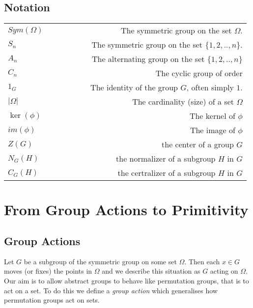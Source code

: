 \documentclass[]{article}
\theoremstyle{definition}
\begin{document}
\subsection{Notation}
\vspace{0.4cm}

\begin{tabular}{lcr}
$Sym(\Omega)$ &  $\qquad \qquad $	&  The symmetric group on the set $\Omega$.\\ 
$S_n$ & & The symmetric group on the set $\{1,2,..,n\}$. \\
$A_n$ & & The alternating group on the set $\{1,2,..,n\}$ \\
$C_n$ & & The cyclic group of order \\
$1_G$ & & The identity of the group $G$, often simply $1$.\\
$|\Omega|$ & & The cardinality (size) of a set $\Omega$\\
$\ker(\phi)$ & & The kernel of $\phi$ \\
$im(\phi)$ & & The image of $\phi$ \\
$Z(G)$ & & the center of a group $G$ \\
$N_G(H)$ & & the normalizer of a subgroup $H$ in $G$ \\
$C_G(H)$ & & the certralizer of a subgroup $H$ in $G$ \\ 
\end{tabular} 
\clearpage
\section{From Group Actions to Primitivity}
\subsection{Group Actions}

Let $G$ be a subgroup of the symmetric group on some set $\Omega$. Then each $x \in G$ moves (or fixes) the points in $\Omega$ and we describe this situation as $G$ acting on $\Omega$. Our aim is to allow abstract groups to behave like permutation groups, that is to act on a set. To do this we define a \emph{group action} which generalises how permutation groups act on sets.
\end{document}
